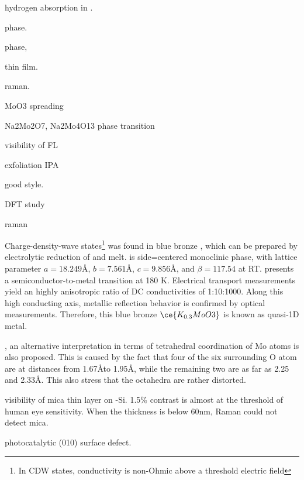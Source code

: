 hydrogen absorption in .\cite{Sha2009}

 phase. \cite{Bramnik2004}

 phase, \cite{Gatehouse1983}

 thin film. \cite{Carcia1987}

 raman.\cite{Hirata1996}

MoO3 spreading \cite{Leyrer1990}

Na2Mo2O7, Na2Mo4O13 phase transition \cite{SinghMudher2005}\cite{Tangri1992}

visibility of FL \cite{Benameur2011}

exfoliation IPA \cite{Halim2013}  \cite{Zhou2011a}

 good style. \cite{Siciliano2009} \cite{Abdellaoui1997}

  DFT study \cite{B511044K} \cite{Cora1997} \cite{Sayede2005}

 raman \cite{Lee2002}

Charge-density-wave states\footnote{In CDW states, conductivity is non-Ohmic above a threshold electric field} was found in blue bronze , which can be prepared by electrolytic reduction of  and  melt.\cite{Dumas1983}  is side=centered monoclinic phase, with lattice parameter $a=18.249$\AA, $b=7.561$\AA, $c=9.856$\AA, and $\beta=117.54$ at RT.
 presents a semiconductor-to-metal transition at 180 K. Electrical transport measurements yield an highly anisotropic ratio of DC conductivities of 1:10:1000. Along this high conducting axis, metallic reflection behavior is confirmed by optical measurements. Therefore, this blue bronze $\ce{K_{0.3}MoO3}$ is known as quasi-1D metal.\cite{Sing1999}

, an alternative interpretation in terms of tetrahedral coordination of Mo atoms is also proposed. This is caused by the fact that four of the six surrounding O atom are at distances from 1.67\AA to 1.95\AA, while the remaining two are as far as 2.25 and 2.33\AA. This also stress that the  octahedra are rather distorted.

visibility of mica thin layer on -Si. \cite{Castellanos-gomez2011} 1.5\% contrast is almost at the threshold of human eye sensitivity.  When the thickness is below 60nm, Raman could not detect mica.

 photocatalytic \cite{Chithambararaj2013}
 (010) surface defect. \cite{Chen2001}

